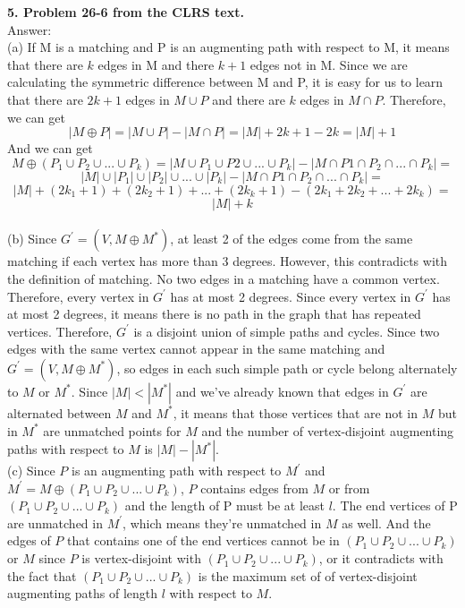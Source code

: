 \documentclass{article}
\begin{document}
\maketitle
\textbf{5. Problem 26-6 from the CLRS text.} \\
\noindent
Answer: \\
(a) If M is a matching and P is an augmenting path with respect to M, it means that there are $k$ edges in M and there $k + 1$ edges not in M. Since we are calculating the symmetric difference between M and P, it is easy for us to learn that there are $2k + 1$ edges in $M\cup P$ and there are $k$ edges in $M\cap P$. Therefore, we can get $$|M \oplus P| = |M\cup P| - |M\cap P| = |M| + 2k + 1 - 2k = |M| + 1$$ And we can get $$M \oplus (P_1\cup P_2 \cup ... \cup P_k )  = |M\cup P_1\cup P2\cup ... \cup P_k| - |M\cap P1\cap P_2\cap ... \cap P_k| = $$ $$|M|\cup |P_1|\cup |P_2|\cup ... \cup |P_k| -  |M\cap P1\cap P_2\cap ... \cap P_k| = $$ $$|M| + (2k_1 + 1) + (2k_2 + 1) + ... + (2k_k + 1) - (2k_1 + 2k_2 + ... + 2k_k) = $$ $$|M| + k$$ \\
(b) Since $G^{'} = (V, M\oplus M^{*})$, at least 2 of the edges come from the same matching if each vertex has more than 3 degrees. However, this contradicts with the definition of matching. No two edges in a matching have a common vertex. Therefore, every vertex in $G^{'}$ has at most 2 degrees. Since every vertex in $G^{'}$ has at most 2 degrees, it means there is no path in the graph that has repeated vertices. Therefore, $G^{'}$ is a disjoint union of simple paths and cycles. Since two edges with the same vertex cannot appear in the same matching and $G^{'} = (V, M\oplus M^{*})$, so edges in each such simple path or cycle belong alternately to $M$ or $M^{*}$. Since $|M| < |M^{*}|$ and we've already known that edges in $G^{'}$ are alternated between $M$ and $M^{*}$, it means that those vertices that are not in $M$ but in $M^{*}$ are unmatched points for $M$ and the number of vertex-disjoint augmenting paths with respect to $M$ is $|M| - |M^{*}|$.\\ \newline
(c) Since $P$ is an augmenting path with respect to $M^{'}$ and $M^{'} = M\oplus (P_1\cup P_2\cup ... \cup P_k)$, $P$ contains edges from $M$ or from $(P_1\cup P_2\cup ... \cup P_k)$ and the length of P must be at least $l$. The end vertices of P are unmatched in $M^{'}$, which means they're unmatched in $M$ as well. And the edges of $P$ that contains one of the end vertices cannot be in $(P_1\cup P_2\cup ... \cup P_k)$ or $M$ since $P$ is vertex-disjoint with $(P_1\cup P_2\cup ... \cup P_k)$, or it contradicts with the fact that $(P_1\cup P_2\cup ... \cup P_k)$ is the maximum set of of vertex-disjoint augmenting paths of length $l$ with respect to $M$.\\ \newline
\end{document}

